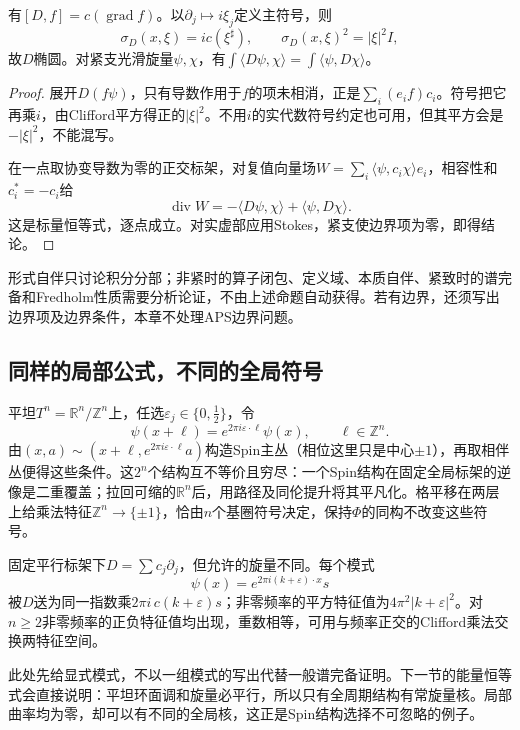 \begin{proposition}\label{prop:dirac-symbol-adjoint}
有$[D,f]=c(\operatorname{grad}f)$。以$\partial_j\mapsto i\xi_j$定义主符号，则
\[
 \sigma_D(x,\xi)=i c(\xi^\sharp),\qquad
 \sigma_D(x,\xi)^2=|\xi|^2I,
\]
故$D$椭圆。对紧支光滑旋量$\psi,\chi$，有$\int\langle D\psi,\chi\rangle=\int\langle\psi,D\chi\rangle$。
\end{proposition}
\begin{proof}
展开$D(f\psi)$，只有导数作用于$f$的项未相消，正是$\sum_i(e_if)c_i$。符号把它再乘$i$，由Clifford平方得正的$|\xi|^2$。不用$i$的实代数符号约定也可用，但其平方会是$-|\xi|^2$，不能混写。

在一点取协变导数为零的正交标架，对复值向量场$W=\sum_i\langle\psi,c_i\chi\rangle e_i$，相容性和$c_i^*=-c_i$给
\[
 \operatorname{div}W=-\langle D\psi,\chi\rangle+\langle\psi,D\chi\rangle.
\]
这是标量恒等式，逐点成立。对实虚部应用Stokes，紧支使边界项为零，即得结论。
\end{proof}
形式自伴只讨论积分分部；非紧时的算子闭包、定义域、本质自伴、紧致时的谱完备和Fredholm性质需要分析论证，不由上述命题自动获得。若有边界，还须写出边界项及边界条件，本章不处理APS边界问题。

\subsection{同样的局部公式，不同的全局符号}
平坦$T^n=\mathbb R^n/\mathbb Z^n$上，任选$\varepsilon_j\in\{0,\tfrac12\}$，令
\[
 \psi(x+\ell)=e^{2\pi i\varepsilon\cdot\ell}\psi(x),\qquad \ell\in\mathbb Z^n.
\]
由$(x,a)\sim(x+\ell,e^{2\pi i\varepsilon\cdot\ell}a)$构造Spin主丛（相位这里只是中心$\pm1$），再取相伴丛便得这些条件。这$2^n$个结构互不等价且穷尽：一个Spin结构在固定全局标架的逆像是二重覆盖；拉回可缩的$\mathbb R^n$后，用路径及同伦提升将其平凡化。格平移在两层上给乘法特征$\mathbb Z^n\to\{\pm1\}$，恰由$n$个基圈符号决定，保持$\Phi$的同构不改变这些符号。

固定平行标架下$D=\sum c_j\partial_j$，但允许的旋量不同。每个模式
\[
 \psi(x)=e^{2\pi i(k+\varepsilon)\cdot x}s
\]
被$D$送为同一指数乘$2\pi i\,c(k+\varepsilon)s$；非零频率的平方特征值为$4\pi^2|k+\varepsilon|^2$。对$n\geq2$非零频率的正负特征值均出现，重数相等，可用与频率正交的Clifford乘法交换两特征空间。

此处先给显式模式，不以一组模式的写出代替一般谱完备证明。下一节的能量恒等式会直接说明：平坦环面调和旋量必平行，所以只有全周期结构有常旋量核。局部曲率均为零，却可以有不同的全局核，这正是Spin结构选择不可忽略的例子。
